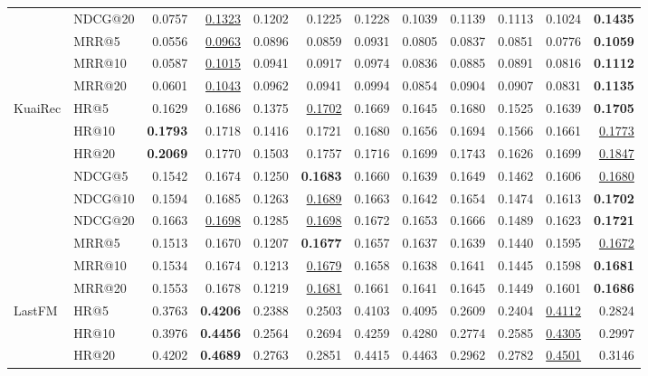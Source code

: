 \begin{tabular}{llrrrrrrrrrr}
 & NDCG@20 & 0.0757 & \underline{0.1323} & 0.1202 & 0.1225 & 0.1228 & 0.1039 & 0.1139 & 0.1113 & 0.1024 & \textbf{0.1435} \\
 & MRR@5 & 0.0556 & \underline{0.0963} & 0.0896 & 0.0859 & 0.0931 & 0.0805 & 0.0837 & 0.0851 & 0.0776 & \textbf{0.1059} \\
 & MRR@10 & 0.0587 & \underline{0.1015} & 0.0941 & 0.0917 & 0.0974 & 0.0836 & 0.0885 & 0.0891 & 0.0816 & \textbf{0.1112} \\
 & MRR@20 & 0.0601 & \underline{0.1043} & 0.0962 & 0.0941 & 0.0994 & 0.0854 & 0.0904 & 0.0907 & 0.0831 & \textbf{0.1135} \\
\hline
KuaiRec & HR@5 & 0.1629 & 0.1686 & 0.1375 & \underline{0.1702} & 0.1669 & 0.1645 & 0.1680 & 0.1525 & 0.1639 & \textbf{0.1705} \\
 & HR@10 & \textbf{0.1793} & 0.1718 & 0.1416 & 0.1721 & 0.1680 & 0.1656 & 0.1694 & 0.1566 & 0.1661 & \underline{0.1773} \\
 & HR@20 & \textbf{0.2069} & 0.1770 & 0.1503 & 0.1757 & 0.1716 & 0.1699 & 0.1743 & 0.1626 & 0.1699 & \underline{0.1847} \\
 & NDCG@5 & 0.1542 & 0.1674 & 0.1250 & \textbf{0.1683} & 0.1660 & 0.1639 & 0.1649 & 0.1462 & 0.1606 & \underline{0.1680} \\
 & NDCG@10 & 0.1594 & 0.1685 & 0.1263 & \underline{0.1689} & 0.1663 & 0.1642 & 0.1654 & 0.1474 & 0.1613 & \textbf{0.1702} \\
 & NDCG@20 & 0.1663 & \underline{0.1698} & 0.1285 & \underline{0.1698} & 0.1672 & 0.1653 & 0.1666 & 0.1489 & 0.1623 & \textbf{0.1721} \\
 & MRR@5 & 0.1513 & 0.1670 & 0.1207 & \textbf{0.1677} & 0.1657 & 0.1637 & 0.1639 & 0.1440 & 0.1595 & \underline{0.1672} \\
 & MRR@10 & 0.1534 & 0.1674 & 0.1213 & \underline{0.1679} & 0.1658 & 0.1638 & 0.1641 & 0.1445 & 0.1598 & \textbf{0.1681} \\
 & MRR@20 & 0.1553 & 0.1678 & 0.1219 & \underline{0.1681} & 0.1661 & 0.1641 & 0.1645 & 0.1449 & 0.1601 & \textbf{0.1686} \\
\hline
LastFM & HR@5 & 0.3763 & \textbf{0.4206} & 0.2388 & 0.2503 & 0.4103 & 0.4095 & 0.2609 & 0.2404 & \underline{0.4112} & 0.2824 \\
 & HR@10 & 0.3976 & \textbf{0.4456} & 0.2564 & 0.2694 & 0.4259 & 0.4280 & 0.2774 & 0.2585 & \underline{0.4305} & 0.2997 \\
 & HR@20 & 0.4202 & \textbf{0.4689} & 0.2763 & 0.2851 & 0.4415 & 0.4463 & 0.2962 & 0.2782 & \underline{0.4501} & 0.3146 \\

\end{tabular}
